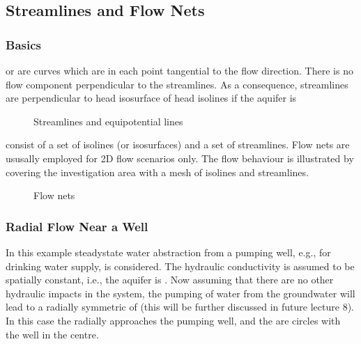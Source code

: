 \documentclass[letterpaper,10pt,english]{sphinxmanual}
\begin{document}
\subsection{Streamlines and Flow Nets}
\label{\detokenize{contents/flow/lecture_06/16_darcy_law_3D:streamlines-and-flow-nets}}

\subsubsection{Basics}
\label{\detokenize{contents/flow/lecture_06/16_darcy_law_3D:basics}}
 or  are curves which are in each point tangential to the flow direction. There is no flow component perpendicular to the streamlines. As a consequence, streamlines are perpendicular to head iso\sphinxhyphen{}surface of head isolines if the aquifer is 

\begin{figure}[htbp]
\centering
\capstart

\noindent{}
\caption{Streamlines and equipotential lines}\label{\detokenize{contents/flow/lecture_06/16_darcy_law_3D:streamlines}}\end{figure}

 consist of a set of isolines (or isosurfaces) and a set of streamlines. Flow nets are ususally employed for 2D flow scenarios only. The flow behaviour is illustrated by covering the investigation area with a  mesh of isolines and streamlines.

\begin{figure}[htbp]
\centering
\capstart

\noindent{}
\caption{Flow nets}\label{\detokenize{contents/flow/lecture_06/16_darcy_law_3D:flownets}}\end{figure}


\subsubsection{Radial Flow Near a Well}
\label{\detokenize{contents/flow/lecture_06/16_darcy_law_3D:radial-flow-near-a-well}}
In this example steady\sphinxhyphen{}state water abstraction from a pumping well, e.g., for drinking water supply, is considered. The hydraulic conductivity is assumed to be spatially constant, i.e., the aquifer is . Now assuming that there are no other hydraulic impacts in the system, the pumping of water from the groundwater will lead to a radially symmetric  of  (this will be further discussed in future lecture 8). In this case the  radially approaches the pumping well, and the  are circles with the well in the centre.
\end{document}
